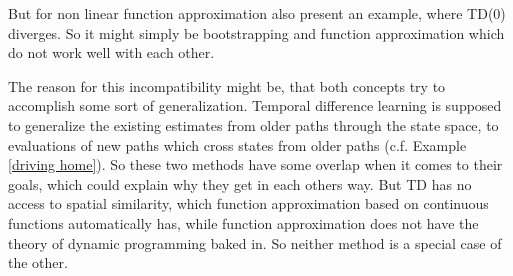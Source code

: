 But for non linear function approximation \textcite{tsitsiklisAnalysisTemporaldifferenceLearning1997} also present an example, where TD(\(0\)) diverges. So it might simply be bootstrapping and function approximation which do not work well with each other. 

The reason for this incompatibility might be, that both concepts try to accomplish some sort of generalization. Temporal difference learning is supposed to generalize the existing estimates from older paths through the state space, to evaluations of new paths which cross states from older paths (c.f. Example \ref{driving home}). So these two methods have some overlap when it comes to their goals, which could explain why they get in each others way. But TD has no access to spatial similarity, which function approximation based on continuous functions automatically has, while function approximation does not have the theory of dynamic programming baked in. So neither method is a special case of the other.



\endinput
